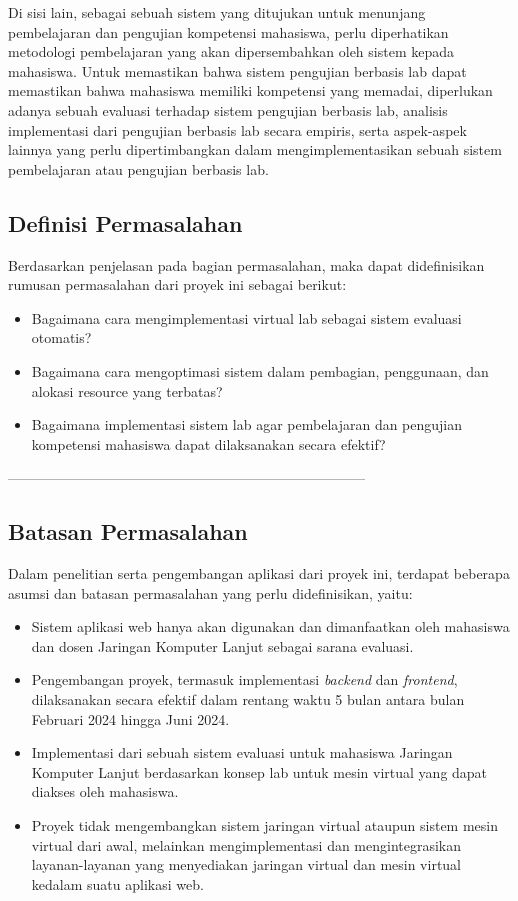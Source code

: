 Di sisi lain, sebagai sebuah sistem yang ditujukan untuk menunjang pembelajaran dan pengujian kompetensi mahasiswa, perlu diperhatikan metodologi pembelajaran
yang akan dipersembahkan oleh sistem kepada mahasiswa. Untuk memastikan bahwa sistem pengujian berbasis lab dapat memastikan bahwa mahasiswa memiliki kompetensi yang memadai,
diperlukan adanya sebuah evaluasi terhadap sistem pengujian berbasis lab, analisis implementasi dari pengujian berbasis lab secara empiris, serta aspek-aspek lainnya
yang perlu dipertimbangkan dalam mengimplementasikan sebuah sistem pembelajaran atau pengujian berbasis lab.  
\par
\subsection{Definisi Permasalahan}
\label{sec:definisiMasalah}
Berdasarkan penjelasan pada bagian permasalahan, maka dapat didefinisikan rumusan permasalahan dari proyek ini sebagai berikut:
\begin{itemize}
	\item Bagaimana cara mengimplementasi virtual lab sebagai sistem evaluasi otomatis?
	\item Bagaimana cara mengoptimasi sistem dalam pembagian, penggunaan, dan alokasi resource yang terbatas?
	\item Bagaimana implementasi sistem lab agar pembelajaran dan pengujian kompetensi mahasiswa dapat dilaksanakan secara efektif?
\end{itemize}
-----------------------------------------------------------------------------%
\subsection{Batasan Permasalahan}
\label{sec:batasanMasalah}
Dalam penelitian serta pengembangan aplikasi dari proyek ini, terdapat beberapa asumsi dan batasan permasalahan yang perlu didefinisikan, yaitu:
\begin{itemize}
	\item Sistem aplikasi web hanya akan digunakan dan dimanfaatkan oleh mahasiswa dan dosen Jaringan Komputer Lanjut sebagai sarana evaluasi.
	\item Pengembangan proyek, termasuk implementasi \textit{backend} dan \textit{frontend}, dilaksanakan secara efektif dalam rentang waktu 5 bulan antara bulan Februari 2024 hingga Juni 2024.
	\item Implementasi dari sebuah sistem evaluasi untuk mahasiswa Jaringan Komputer Lanjut berdasarkan konsep lab untuk mesin virtual yang dapat diakses oleh mahasiswa.
	\item Proyek tidak mengembangkan sistem jaringan virtual ataupun sistem mesin virtual dari awal, melainkan mengimplementasi dan mengintegrasikan layanan-layanan yang menyediakan jaringan virtual dan mesin virtual kedalam suatu aplikasi web.
\end{itemize}

